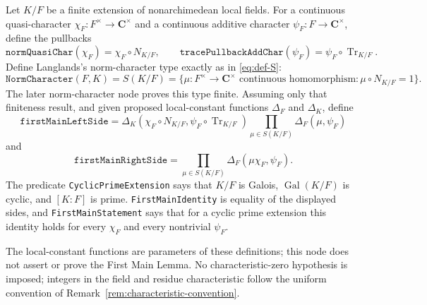 \begin{definition}\label{mod:delta-firstmainstatement}
Let $K/F$ be a finite extension of nonarchimedean local fields.  For a
continuous quasi-character $\chi_F:F^\times\to\mathbf C^\times$ and a
continuous additive character $\psi_F:F\to\mathbf C^\times$, define the
pullbacks
\[
 \texttt{normQuasiChar}(\chi_F)=\chi_F\circ N_{K/F},\qquad
 \texttt{tracePullbackAddChar}(\psi_F)
 =\psi_F\circ\operatorname{Tr}_{K/F}.
\]
Define Langlands's norm-character type exactly as in \eqref{eq:def-S}:
\[
 \texttt{NormCharacter}(F,K)=S(K/F)
 =\{\mu:F^\times\to\mathbf C^\times\text{ continuous homomorphism}:
      \mu\circ N_{K/F}=1\}.
\]
The later norm-character node proves this type finite.  Assuming only that
finiteness result, and given proposed local-constant functions $\Delta_F$
and $\Delta_K$, define
\[
 \texttt{firstMainLeftSide}
 =\Delta_K(\chi_F\circ N_{K/F},\psi_F\circ\operatorname{Tr}_{K/F})
   \prod_{\mu\in S(K/F)}\Delta_F(\mu,\psi_F)
\]
and
\[
 \texttt{firstMainRightSide}
 =\prod_{\mu\in S(K/F)}\Delta_F(\mu\chi_F,\psi_F).
\]
The predicate \texttt{CyclicPrimeExtension} says that $K/F$ is Galois,
$\operatorname{Gal}(K/F)$ is cyclic, and $[K:F]$ is prime.
\texttt{FirstMainIdentity} is equality of the displayed sides, and
\texttt{FirstMainStatement} says that for a cyclic prime extension this
identity holds for every $\chi_F$ and every nontrivial $\psi_F$.

The local-constant functions are parameters of these definitions; this node
does not assert or prove the First Main Lemma.  No characteristic-zero
hypothesis is imposed; integers in the field and residue characteristic
follow the uniform convention of
Remark~\ref{rem:characteristic-convention}.
\leanok
{}
\FormalizationContract
\end{definition}
